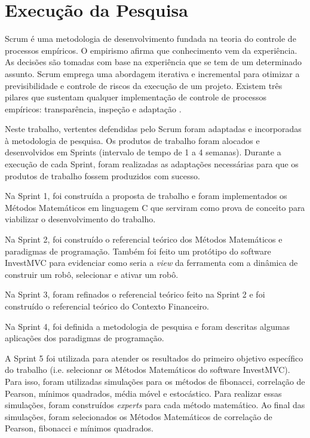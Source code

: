 \section{Execução da Pesquisa}
\label{sec:execucaoPesquisa}

Scrum é uma metodologia de desenvolvimento fundada na teoria do controle de processos empíricos. O empirismo afirma que conhecimento vem da experiência. As decisões são tomadas com base na experiência que se tem de um determinado assunto. Scrum emprega uma abordagem iterativa e incremental para otimizar a previsibilidade e controle de riscos da execução de um projeto. Existem três pilares que sustentam qualquer implementação de controle de processos empíricos: transparência, inspeção e adaptação \cite[pág.~4]{schwaber2013}.

Neste trabalho, vertentes defendidas pelo Scrum foram adaptadas e incorporadas à metodologia de pesquisa. Os produtos de  trabalho foram alocados e desenvolvidos em Sprints (intervalo de tempo de 1 a 4 semanas). Durante a execução de cada Sprint, foram realizadas as adaptações necessárias para que os produtos de trabalho fossem produzidos com sucesso.

Na Sprint 1, foi construída a proposta de trabalho e foram implementados os Métodos Matemáticos em linguagem C que serviram como prova de conceito para viabilizar o desenvolvimento do trabalho.

Na Sprint 2, foi construído o referencial teórico dos Métodos Matemáticos e paradigmas de programação. Também foi feito um protótipo do software InvestMVC para evidenciar como seria a \textit{view} da ferramenta com a dinâmica de construir um robô, selecionar e ativar um robô.

Na Sprint 3, foram refinados o referencial teórico feito na Sprint 2 e foi construído o referencial teórico do Contexto Financeiro.

Na Sprint 4, foi definida a metodologia de pesquisa e foram descritas algumas aplicações dos paradigmas de programação.

A Sprint 5 foi utilizada para atender os resultados do primeiro objetivo específico do trabalho (i.e. selecionar os Métodos Matemáticos do software InvestMVC). Para isso, foram utilizadas simulações para os métodos de fibonacci, correlação de Pearson, mínimos quadrados, média móvel e estocástico. Para realizar essas simulações, foram construídos \textit{experts} para cada método matemático. Ao final das simulações, foram selecionados os Métodos Matemáticos de correlação de Pearson, fibonacci e mínimos quadrados.

